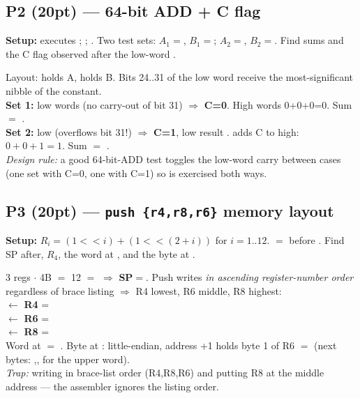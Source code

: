 \subsection{P2 (20pt) --- 64-bit ADD + C flag}
\textbf{Setup:}  executes ; ; . Two test sets: $A_1=$, $B_1=$; $A_2=$, $B_2=$. Find sums and the C flag observed after the low-word .
\begin{qp}
Layout:  holds A,  holds B. Bits 24..31 of the low word receive the most-significant nibble of the constant.\\
\textbf{Set 1:} low words  (no carry-out of bit 31) $\Rightarrow$ \textbf{C=0}. High words 0+0+0=0. Sum $=$ .\\
\textbf{Set 2:} low  (overflows bit 31!) $\Rightarrow$ \textbf{C=1}, low result .  adds C to high: $0+0+1=1$. Sum $=$ .\\
\emph{Design rule:} a good 64-bit-ADD test toggles the low-word carry between cases (one set with C=0, one with C=1) so  is exercised both ways.
\end{qp}

\subsection{P3 (20pt) --- \texttt{push \{r4,r8,r6\}} memory layout}
\textbf{Setup:} $R_i = (1{<}{<}i) + (1{<}{<}(2{+}i))$ for $i=1..12$.  $=$  before . Find SP after, $R_4$, the word at , and the byte at .
\begin{qp}
3 regs $\cdot$ 4B $=$ 12 $=$  $\Rightarrow$ \textbf{SP$=$}. Push writes \emph{in ascending register-number order} regardless of brace listing $\Rightarrow$ R4 lowest, R6 middle, R8 highest:\\
\quad {} $\leftarrow$ \textbf{R4} = \\
\quad {} $\leftarrow$ \textbf{R6} = \\
\quad {} $\leftarrow$ \textbf{R8} = \\
Word at  $=$ \textbf{}. Byte at : little-endian, address +1 holds byte 1 of R6 $=$ \textbf{} (next bytes: ,, for the upper word).\\
\emph{Trap:} writing in brace-list order (R4,R8,R6) and putting R8 at the middle address --- the assembler ignores the listing order.
\end{qp}

